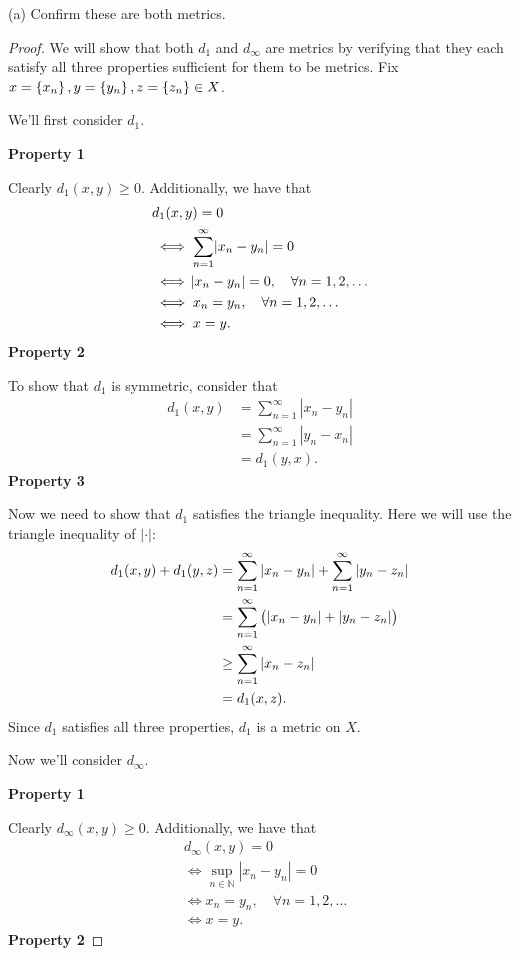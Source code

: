 \documentclass{article}
\newcommand{\N}{\mathbb{N}}
\begin{document}
(a) Confirm these are both metrics.

\begin{proof}

We will show that both $d_1$ and $d_\infty$ are metrics by verifying
that they each satisfy all three properties sufficient for them to be
metrics. Fix $x = \cbr{x_n}, y = \cbr{y_n}, z = \cbr{z_n} \in X$.

We'll first consider $d_1$.

\textbf{Property 1}

Clearly $d_1(x, y) \geq 0$. Additionally, we have that
%
\begin{align*}
    &d_1(x, y) = 0 \\
    &\iff \sum_{n = 1}^\infty \envert{x_n - y_n} = 0 \\
    &\iff \envert{x_n - y_n} = 0, \quad \forall n = 1, 2, \ldots \\
    &\iff x_n = y_n, \quad \forall n = 1, 2, \ldots \\
    &\iff x = y
    .
\end{align*}
%
\textbf{Property 2}

To show that $d_1$ is symmetric, consider that
%
\begin{align*}
    d_1(x, y)
        &= \sum_{n = 1}^\infty |x_n - y_n| \\
        &= \sum_{n = 1}^\infty |y_n - x_n| \\
        &= d_1(y, x)
        .
\end{align*}
%
\textbf{Property 3}

Now we need to show that $d_1$ satisfies the triangle inequality.
Here we will use the triangle inequality of $|\cdot|$:
%
\begin{align*}
    d_1(x, y) + d_1(y, z)
        &= \sum_{n = 1}^\infty |x_n - y_n| + \sum_{n = 1}^\infty |y_n - z_n| \\
        &= \sum_{n = 1}^\infty \del{|x_n - y_n| + |y_n - z_n|} \\
        &\geq \sum_{n = 1}^\infty |x_n - z_n| \\
        &= d_1(x, z)
        .
\end{align*}
%
Since $d_1$ satisfies all three properties, $d_1$ is a metric on $X$.

Now we'll consider $d_\infty$.

\textbf{Property 1}

Clearly $d_\infty(x, y) \geq 0$. Additionally, we have that
%
\begin{align*}
    &d_\infty(x, y) = 0 \\
    &\iff \sup_{n \in \N} |x_n - y_n| = 0 \\
    &\iff x_n = y_n, \quad \forall n = 1, 2, \ldots \\
    &\iff x = y
    .
\end{align*}
%
\textbf{Property 2}


\end{proof}
\end{document}
